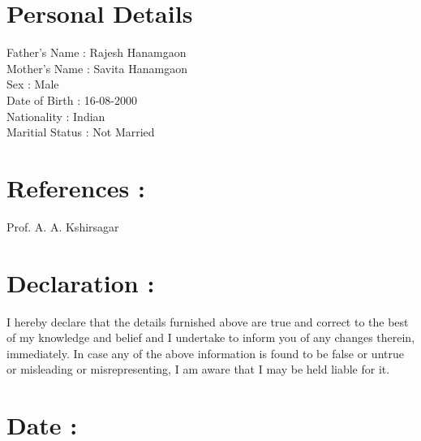 \documentclass[margin]{res}
\begin{document}
\begin{resume}
\section{Personal Details}            
Father's Name \hspace{10mm} : Rajesh Hanamgaon\\
Mother's Name\hspace{10mm} : Savita Hanamgaon\\
Sex \hspace{27mm}  : Male \\
Date of Birth \hspace{12mm} : 16-08-2000 \\
Nationality\hspace{16mm} : Indian \\
Maritial Status\hspace{10mm} : Not Married\\ 

\section{References :} Prof. A. A. Kshirsagar\\
\section{Declaration :}  I hereby declare that the details furnished above are true and correct to the best of my knowledge
and belief and I undertake to inform you of any changes therein, immediately. In case any of the above
information is found to be false or untrue or misleading or misrepresenting, I am aware that I may be held liable
for it.\\
\section{Date :}\hspace{2mm}{\today} \\


\end{resume}
\end{document}

